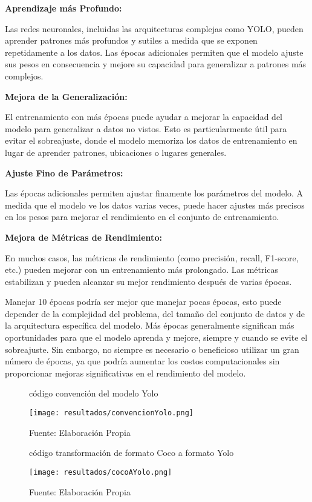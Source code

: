 \textbf{Aprendizaje más Profundo:}

Las redes neuronales, incluidas las arquitecturas complejas como YOLO, pueden aprender patrones más profundos y sutiles a medida que se exponen repetidamente a los datos. Las épocas adicionales permiten que el modelo ajuste sus pesos en consecuencia y mejore su capacidad para generalizar a patrones más complejos.

\textbf{Mejora de la Generalización:}

El entrenamiento con más épocas puede ayudar a mejorar la capacidad del modelo para generalizar a datos no vistos. Esto es particularmente útil para evitar el sobreajuste, donde el modelo memoriza los datos de entrenamiento en lugar de aprender patrones, ubicaciones o lugares generales.

\textbf{Ajuste Fino de Parámetros:}

Las épocas adicionales permiten ajustar finamente los parámetros del modelo. A medida que el modelo ve los datos varias veces, puede hacer ajustes más precisos en los pesos para mejorar el rendimiento en el conjunto de entrenamiento.

\newpage

\textbf{Mejora de Métricas de Rendimiento:}

En muchos casos, las métricas de rendimiento (como precisión, recall, F1-score, etc.) pueden mejorar con un entrenamiento más prolongado. Las métricas estabilizan y pueden alcanzar su mejor rendimiento después de varias épocas.

Manejar 10 épocas podría ser mejor que manejar pocas épocas, esto puede depender de la complejidad del problema, del tamaño del conjunto de datos y de la arquitectura específica del modelo. Más épocas generalmente significan más oportunidades para que el modelo aprenda y mejore, siempre y cuando se evite el sobreajuste. Sin embargo, no siempre es necesario o beneficioso utilizar un gran número de épocas, ya que podría aumentar los costos computacionales sin proporcionar mejoras significativas en el rendimiento del modelo.

\begin{figure}[h]
\centering
\caption{código convención del modelo Yolo}
\texttt{[image: resultados/convencionYolo.png]}
\caption*{\footnotesize Fuente: Elaboración Propia}
\label{fig:figuraConvencionYolo}
\end{figure}

\newpage

\begin{figure}[h]
\centering
\caption{código transformación de formato Coco a formato Yolo}
\texttt{[image: resultados/cocoAYolo.png]}
\caption*{\footnotesize Fuente: Elaboración Propia}
\label{fig:figuraCocoAYolo}
\end{figure}

